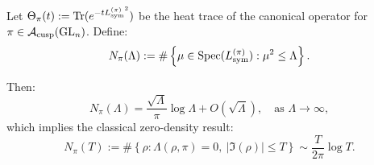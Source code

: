 \begin{proposition}
\label{prop:spectral_counting_law_pi}
Let \( \Theta_\pi(t) := \operatorname{Tr}(e^{-t {L_{\mathrm{sym}}^{(\pi)}}^2}) \) be the heat trace of the canonical operator for \( \pi \in \mathcal{A}_{\mathrm{cusp}}(\mathrm{GL}_n) \). Define:
\[
N_\pi(\Lambda) := \#\left\{ \mu \in \operatorname{Spec}({L_{\mathrm{sym}}^{(\pi)}}) : \mu^2 \le \Lambda \right\}.
\]

Then:
\[
N_\pi(\Lambda) = \frac{\sqrt{\Lambda}}{\pi} \log \Lambda + O(\sqrt{\Lambda}), \quad \text{as } \Lambda \to \infty,
\]
which implies the classical zero-density result:
\[
N_\pi(T) := \#\left\{ \rho : \Lambda(\rho, \pi) = 0, \ |\Im(\rho)| \le T \right\}
\sim \frac{T}{2\pi} \log T.
\]
\end{proposition}
